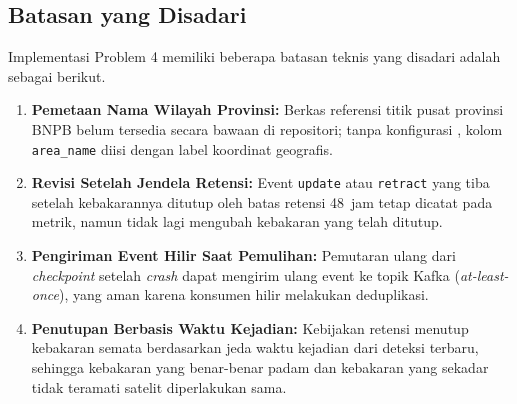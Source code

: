 \subsection{Batasan yang Disadari}
Implementasi Problem 4 memiliki beberapa batasan teknis yang disadari adalah sebagai berikut.
\begin{enumerate}
    \item \textbf{Pemetaan Nama Wilayah Provinsi:} Berkas referensi titik pusat provinsi BNPB belum tersedia secara bawaan di repositori; tanpa konfigurasi , kolom \texttt{area\_name} diisi dengan label koordinat geografis.
    \item \textbf{Revisi Setelah Jendela Retensi:} Event \texttt{update} atau \texttt{retract} yang tiba setelah kebakarannya ditutup oleh batas retensi 48~jam tetap dicatat pada metrik, namun tidak lagi mengubah kebakaran yang telah ditutup.
    \item \textbf{Pengiriman Event Hilir Saat Pemulihan:} Pemutaran ulang dari \textit{checkpoint} setelah \textit{crash} dapat mengirim ulang event ke topik Kafka (\textit{at-least-once}), yang aman karena konsumen hilir melakukan deduplikasi.
    \item \textbf{Penutupan Berbasis Waktu Kejadian:} Kebijakan retensi menutup kebakaran semata berdasarkan jeda waktu kejadian dari deteksi terbaru, sehingga kebakaran yang benar-benar padam dan kebakaran yang sekadar tidak teramati satelit diperlakukan sama.
\end{enumerate}

\vspace{1em}

